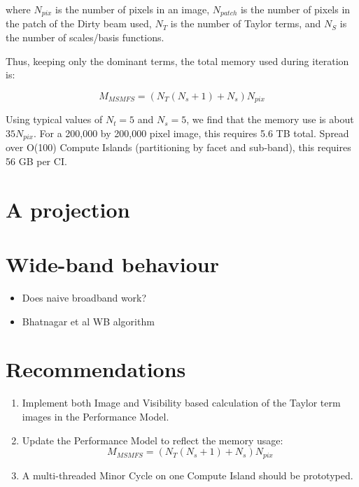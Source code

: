 \documentclass[11pt,a4paper]{article}
\begin{document}
where $N_{pix}$ is the number of pixels in an image, $N_{patch}$ is the number of pixels in the patch of the Dirty beam used, $N_T$ is the number of Taylor terms, and $N_S$ is the number of scales/basis functions.

Thus, keeping only the dominant terms, the total memory used during iteration is: 

\begin{equation}
M_{MSMFS} = (N_T (N_s + 1) + N_s) N_{pix} 
\end{equation}

Using typical values of $N_t=5$ and $N_s=5$, we find that the memory use is about $35 N_{pix}$. For a 200,000 by 200,000 pixel image, this requires 5.6 TB total. Spread over O(100) Compute Islands (partitioning by facet and sub-band), this requires 56 GB per CI.



\clearpage
\section{A projection}
\label{sec:minor}

\clearpage
\section{Wide-band behaviour}
\label{sec:wideband}

\begin{itemize}
\item Does naive broadband work?
\item Bhatnagar et al WB algorithm	
\end{itemize}


\clearpage
\section{Recommendations}
\label{sec:recommendations}

\begin{enumerate}
\item Implement both Image and Visibility based calculation of the Taylor term images in the Performance Model.
\item Update the Performance Model to reflect the memory usage:
\begin{equation}
M_{MSMFS} = (N_T (N_s + 1) + N_s) N_{pix} 
\end{equation}
\item A multi-threaded Minor Cycle on one Compute Island should be prototyped.
\end{enumerate}






\clearpage {}
%
\end{document}
